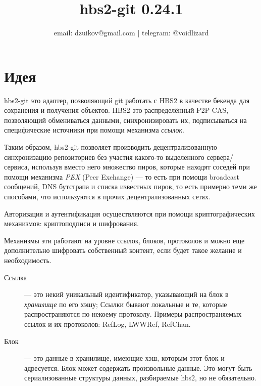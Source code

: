 \documentclass[11pt,a4paper]{article}
\title{hbs2-git 0.24.1}
\author{%
    email: dzuikov@gmail.com | telegram: @voidlizard
}
\newcommand{\term}[2]{\textit{#2}}
\begin{document}
\maketitle


\tableofcontents

\section{Идея}

hbs2-git это адаптер, позволяющий git работать с HBS2 в качестве бекенда для сохранения и получения
объектов. HBS2 это распределённый P2P CAS, позволяющий обмениваться данными, синхронизировать их,
подписываться на специфические источники при помощи механизма \term{references}{ссылок}.

Таким образом, hbs2-git позволяет производить децентрализованную синхронизацию репозиториев без
участия какого-то выделенного сервера/сервиса, используя вместо него множество пиров, которые
находят соседей при помощи механизма \term{pex}{PEX} (Peer Exchange) --- то есть при помощи
broadcast сообщений, DNS бутстрапа и списка известных пиров, то есть примерно  теми же способами,
что используются в прочих децентрализованных сетях.

Авторизация и аутентификация осуществляются при помощи криптографических механизмов: криптоподписи
и шифрования.

Механизмы эти работают на уровне ссылок, блоков, протоколов и можно еще дополнительно шифровать
собственный контент, если будет такое желание и необходимость.

\begin{description}
  \item[Ссылка] --- это некий уникальный идентификатор, указывающий на блок в \textit{хранилище} по
    его хэшу; Ссылки бывают локальные и те, которые распространяются по некоему протоколу. Примеры
    распространяемых ссылок и их протоколов: RefLog, LWWRef, RefChan.

  \item[Блок]   --- это данные в хранилище, имеющие хэш, которым этот блок и адресуется. Блок может
    содержать произвольные данные. Это могут быть сериализованные структуры данных, разбираемые
    hbs2, но не обязательно.
\end{description}
\end{document}

